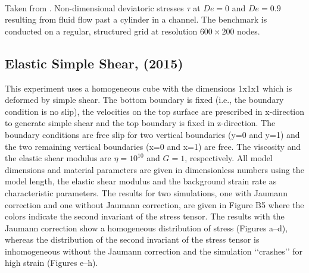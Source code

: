 \begin{center}
\\
{\captionfont Taken from \textcite{bepo10}.
Non-dimensional deviatoric stresses $\tau$ at $De = 0$ and $De = 0.9$ 
resulting from fluid flow past a cylinder in a channel. The benchmark is conducted
on a regular, structured grid at resolution $600 \times 200$ nodes.
}
\end{center}




\subsection{Elastic Simple Shear,  \textcite{vosc15} (2015)}



This experiment uses a homogeneous cube with the dimensions 1x1x1 which is
deformed by simple shear. The bottom boundary is fixed 
(i.e., the boundary condition is no slip), the
velocities on the top surface are prescribed in x-direction to generate 
simple shear and the top boundary is fixed in z-direction. 
The boundary conditions are free slip for two vertical boundaries (y=0 and
y=1) and the two remaining vertical boundaries (x=0 and x=1) are free. 
The viscosity and the elastic shear modulus are $\eta=10^{10}$ and $G=1$, 
respectively. All model dimensions and material parameters
are given in dimensionless numbers using the model length, the elastic 
shear modulus and the background strain rate as characteristic parameters. 
The results for two simulations, one with Jaumann correction and one without 
Jaumann correction, are given in Figure B5 where the colors indicate the
second invariant of the stress tensor. The results with the Jaumann correction 
show a homogeneous distribution of stress (Figures a–d), whereas the distribution 
of the second invariant of the stress tensor is inhomogeneous without the 
Jaumann correction and the simulation ‘‘crashes’’ for high strain
(Figures e–h).

